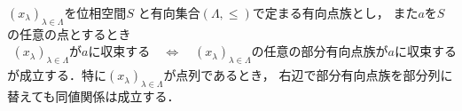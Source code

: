 	\begin{screen}
		\begin{thm}
		\label{thm:a_net_converges_iff_every_subnet_converges}
			$(x_\lambda)_{\lambda \in \Lambda}$を位相空間$S$
			と有向集合$(\Lambda,\leq)$で定まる有向点族とし，
			また$a$を$S$の任意の点とするとき
			\begin{align}
				\mbox{$(x_\lambda)_{\lambda \in \Lambda}$が$a$に収束する}
				\quad \Longleftrightarrow \quad
				\mbox{$(x_\lambda)_{\lambda \in \Lambda}$
				の任意の部分有向点族が$a$に収束する}
				\label{eq:thm_a_net_converges_iff_every_subnet_converges_2}
			\end{align}
			が成立する．特に$(x_\lambda)_{\lambda \in \Lambda}$が点列であるとき，
			右辺で部分有向点族を部分列に替えても同値関係は成立する．
		\end{thm}
	\end{screen}
	
